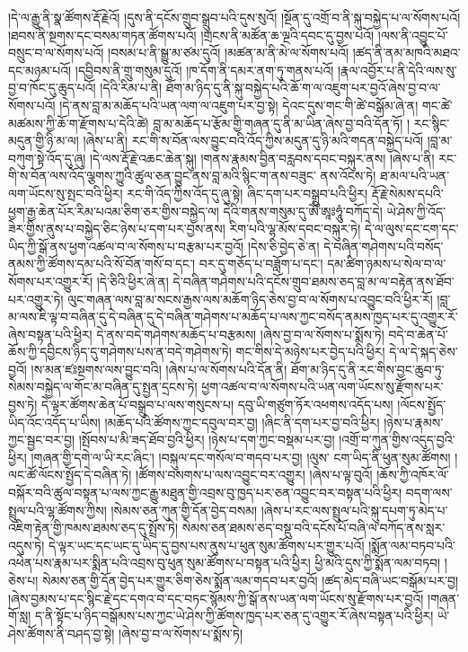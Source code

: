།དེ་ལ་རྒྱུ་ནི་སྣ་ཚོགས་རྡོ་རྗེའོ། །དུས་ནི་དངོས་གྲུབ་སྒྲུབ་པའི་དུས་སུའོ། །སྔོན་དུ་འགྲོ་བ་ནི་སྐུ་བསྐྱེད་པ་ལ་སོགས་པའོ། །ཐབས་ནི་སྔགས་དང་བསམ་གཏན་ཚོགས་པའོ། །གྲངས་ནི་མཚོན་ཆ་ལྔའི་དབང་དུ་བྱས་པའོ། །ལས་ནི་འབྱུང་པོ་བསྲུང་བ་ལ་སོགས་པའོ། །བསམ་པ་ནི་སྒྱུ་མ་ཙམ་དུའོ། །མཚན་མ་ནི་མེ་ལ་སོགས་པའོ། །ཚད་ནི་ནམ་མཁའི་མཐའ་དང་མཉམ་པའོ། །དབྱིབས་ནི་གྲུ་གསུམ་དུའོ། །ཁ་དོག་ནི་དམར་ནག་ཏུ་གནས་པའོ། །རྣལ་འབྱོར་པ་ནི་དེའི་ལས་སུ་བྱ་བ་ཁོང་དུ་ཆུད་པའོ། །དེའི་རིམ་པ་ནི། ཐོག་མ་ཉིད་དུ་ནི་སྐུ་བསྐྱེད་པའི་ཆོ་ག་ལ་འཇུག་པར་བྱའོ་ཞེས་བྱ་བ་ལ་སོགས་པའོ། །དེ་ནས་བླ་མ་མཆོད་པའི་ཡན་ལག་ལ་འཇུག་པར་བྱ་སྟེ། དེའང་དུས་གང་གི་ཚེ་བསྒོམ་ཞེ་ན། གང་ཚེ་མཚམས་ཀྱི་ཆོ་ག་རྫོགས་པ་དེའི་ཚེ། བླ་མ་མཆོད་པ་རྩོམ་གྱི་གཞན་དུ་ནི་མ་ཡིན་ཞེས་བྱ་བའི་དོན་ཏོ། །
རང་སྙིང་མདུན་གྱི་ཉི་མ་ལ། །ཞེས་པ་ནི། རང་གི་ས་བོན་ལས་བྱུང་བའི་འོད་ཀྱིས་མདུན་དུ་ཉི་མའི་གདན་བསྐྱེད་པའོ། །བླ་མ་བཀུག་སྟེ་འོད་དུ་ཞུ། །དེ་ལས་རྡོ་རྗེ་འཆང་ཆེན་སྐུ། །གནས་རྣམས་བྱིན་བརླབས་དབང་བསྐུར་ནས། །ཞེས་པ་ནི། རང་གི་ས་བོན་ལས་འོད་ལྕགས་ཀྱུའི་ཚུལ་ཅན་བྱུང་ནས་བླ་མའི་སྙིང་ག་ནས་བཟུང་​ ནས་འོངས་ཏེ། ཐ་མལ་པའི་ཡན་ལག་ཡོངས་སུ་སྤང་བའི་ཕྱིར། རང་གི་འོད་ཀྱིས་འོད་དུ་ཞུ་སྟེ། ཞིང་དག་པར་བསྒྲུབ་པའི་ཕྱིར། རྡོ་རྗེ་སེམས་དཔའི་ཕྱག་རྒྱ་ཆེན་པོར་རིམ་པའམ་ཅིག་ཅར་གྱིས་བསྐྱེད་ལ། དེའི་གནས་གསུམ་དུ་ཨོཾ་ཨཱཿཧཱུཾ་བཀོད་དེ། ཡེ་ཤེས་ཀྱི་འོད་ཟེར་གྱིས་ནུས་པ་བསྐྱེད་ཅིང་ཉེས་པ་དག་པར་བྱས་ནས། རིག་པའི་ལྷ་མོས་དབང་བསྐུར་ཏེ། དེ་ལ་ལུས་དང་ངག་དང་ཡིད་ཀྱི་སྒོ་ནས་ཕྱག་འཚལ་བ་ལ་སོགས་པ་བརྩམ་པར་བྱའོ། །དེས་ཅི་བྱེད་ཅེ་ན། དེ་བཞིན་གཤེགས་པའི་བསོད་ནམས་ཀྱི་ཚོགས་དམ་པའི་སོ་བོན་གསོ་བ་དང་། བར་དུ་གཅོད་པ་བཟློག་པ་དང་། དམ་ཚིག་ཉམས་པ་སེལ་བ་ལ་སོགས་པར་འགྱུར་རོ། །དེ་ཅིའི་ཕྱིར་ཞེ་ན། དེ་བཞིན་གཤེགས་པའི་དངོས་གྲུབ་ཐམས་ཅད་བླ་མ་ལ་བརྟེན་ནས་ཐོབ་པར་འགྱུར་ཏེ། ལུང་གཞན་ལས་བླ་མ་སངས་རྒྱས་ལས་མཆོག་ཉིད་ཅེས་བྱ་བ་ལ་སོགས་པ་འབྱུང་བའི་ཕྱིར་རོ། །བླ་མ་ལས་ཇི་ལྟ་བ་བཞིན་དུ་དེ་བཞིན་དུ་དེ་བཞིན་གཤེགས་པ་མཆོད་པ་ལས་ཀྱང་བསོད་ནམས་ཁྱད་པར་དུ་འགྱུར་རོ་ཞེས་བསྟན་པའི་ཕྱིར། དེ་ནས་བདེ་གཤེགས་མཆོད་པ་བརྩམས། །ཞེས་བྱ་བ་ལ་སོགས་པ་སྨོས་ཏེ། བདེ་བ་ཆེན་པོ་ཆོས་ཀྱི་དབྱིངས་ཉིད་དུ་གཤེགས་པས་ན་བདེ་གཤེགས་ཏེ། གང་གིས་དེ་མཉེས་པར་བྱེད་པའི་ཕྱིར། དེ་ལ་དེ་སྐད་ཅེས་བྱའོ། །ས་མན་ཛཿསྔགས་ལས་བྱུང་བའི། །ཞེས་པ་ལ་སོགས་པའི་དོན་ནི། ཐོག་མ་ཉིད་དུ་ནི་རང་གིས་བྱང་ཆུབ་ཏུ་སེམས་བསྐྱེད་ལ་གོང་མ་བཞིན་དུ་སྤྱན་དྲངས་ཏེ། ཕྱག་འཚལ་བ་ལ་སོགས་པའི་ཡན་ལག་ཡོངས་སུ་རྫོགས་པར་བྱས་ཏེ། དེ་ལྟར་ཚོགས་ཆེན་པོ་བསྒྲུབ་པ་ལས་གསུངས་པ། དབུ་ཡི་གཙུག་ཏོར་འཕགས་འདོད་པས། །ལོངས་སྤྱོད་ཡིད་འོང་འདོད་པ་ཡིས། །མཆོད་པའི་ཚོགས་ཀྱང་དབུལ་བར་བྱ། །ཞིང་ནི་དག་པར་བྱ་བའི་ཕྱིར། །ཉེས་པ་རྣམས་ཀྱང་སྦྱང་བར་བྱ། །སྤོབས་པ་མི་ཟད་ཐོབ་བྱའི་ཕྱིར། །ཉེས་པ་དག་ཀྱང་བསྡམ་པར་བྱ། །འགྲོ་བ་ཀུན་གྱིས་འདུད་བྱའི་ཕྱིར། །གཞན་གྱི་དགེ་ལ་ཡི་རང་ཞིང་། །བསྐུལ་དང་གསོལ་བ་གདབ་པར་བྱ། །ལུས་​ ངག་ཡིད་ནི་ཕུན་སུམ་ཚོགས། །ལང་ཚོ་ལོངས་སྤྱོད་དེ་བཞིན་ཏེ། །ཚོགས་བསགས་པ་ལས་འབྱུང་བར་འགྱུར། །ཞེས་པ་ལྟ་བུའོ། །ཆོས་ཀྱི་འཁོར་ལོ་བསྐོར་བའི་ཚུལ་བསྟན་པ་ལས་ཀྱང་རྒྱུ་མཐུན་གྱི་འབྲས་བུ་ཁྱད་པར་ཅན་འབྱུང་བར་བསྟན་པའི་ཕྱིར། བདག་ལས་སྤྲུལ་པའི་ལྷ་ཚོགས་ཀྱིས། །སེམས་ཅན་ཀུན་གྱི་དོན་བྱེད་བསམ། །ཞེས་པ་རང་ལས་སྤྲུལ་པའི་སྐུ་དཔག་ཏུ་མེད་པ་འཇིག་རྟེན་གྱི་ཁམས་ཐམས་ཅད་དུ་སྤྲོས་ཏེ། སེམས་ཅན་ཐམས་ཅད་བསྡུ་བའི་དངོས་པོ་བཞི་ལ་བཀོད་ནས་སླར་འདུས་ཏེ། དེ་ལྟར་ཡང་དང་ཡང་དུ་ཡིད་དུ་བྱས་པས་ནུས་པ་ཕུན་སུམ་ཚོགས་པར་གྱུར་པའོ། །སྨོན་ལམ་བཏབ་པའི་འཕེན་པས་རྣམ་པར་སྨིན་པའི་འབྲས་བུ་ཕུན་སུམ་ཚོགས་པ་བསྟན་པའི་ཕྱིར། ཕྱི་མའི་དུས་ཀྱི་སྨོན་ལམ་བཏབ། །ཅེས་པ། སེམས་ཅན་གྱི་དོན་བྱེད་པར་གྱུར་ཅིག་ཅེས་སྨོན་ལམ་གདབ་པར་བྱའོ། །ཚད་མེད་བཞི་ཡང་བསྒོམ་པར་བྱ། །ཞེས་བྱམས་པ་དང་སྙིང་རྗེ་དང་དགའ་བ་དང་བཏང་སྙོམས་ཀྱི་སྒོ་ནས་ཡན་ལག་ཡོངས་སུ་རྫོགས་པར་བྱའོ། །གཞན་གོ་སླ། ད་ནི་སྟོང་པ་ཉིད་བསྒོམས་པས་ཀྱང་ཡེ་ཤེས་ཀྱི་ཚོགས་ཁྱད་པར་ཅན་དུ་འགྱུར་རོ་ཞེས་བསྟན་པའི་ཕྱིར། ཡེ་ཤེས་ཚོགས་ནི་བཤད་བྱ་སྟེ། །ཞེས་བྱ་བ་ལ་སོགས་པ་སྨོས་ཏེ། 